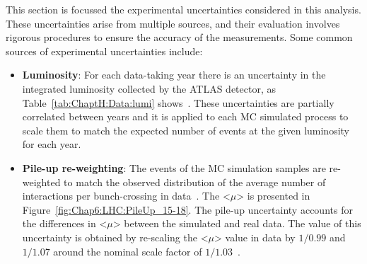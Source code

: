 This section is focussed the experimental uncertainties considered in this analysis. These 
uncertainties arise from multiple sources, and their evaluation involves rigorous procedures to ensure 
the accuracy of the measurements. Some common sources of experimental uncertainties include:
\begin{itemize}
	
	\item \textbf{Luminosity}: For each data-taking year there is an uncertainty in the integrated 
		luminosity collected by the ATLAS detector, 
		as Table~\ref{tab:ChaptH:Data:lumi} shows~\cite{ATLAS:2022hro, Avoni:2018iuv}. 
		These uncertainties are partially correlated between years and it is applied to each
		 MC simulated process to scale them to match the expected number of events 
		 at the given luminosity for each year.
	
	\item \textbf{Pile-up re-weighting}: The events of the MC simulation samples are re-weighted 
		to match the observed distribution of the average number of interactions per bunch-crossing 
		in data~\cite{Marshall:2014mza}. The <$\mu$> is presented in Figure~\ref{fig:Chap6:LHC:PileUp_15-18}. 
		The pile-up uncertainty accounts for the differences in <$\mu$> between the simulated and
		real data.
		The value of this uncertainty is obtained by re-scaling the <$\mu$>  value in data by 
		$1/0.99$ and $1/1.07$ around the nominal scale factor of $1/1.03$~\cite{Buttinger:2014726}.
	

\end{itemize}
